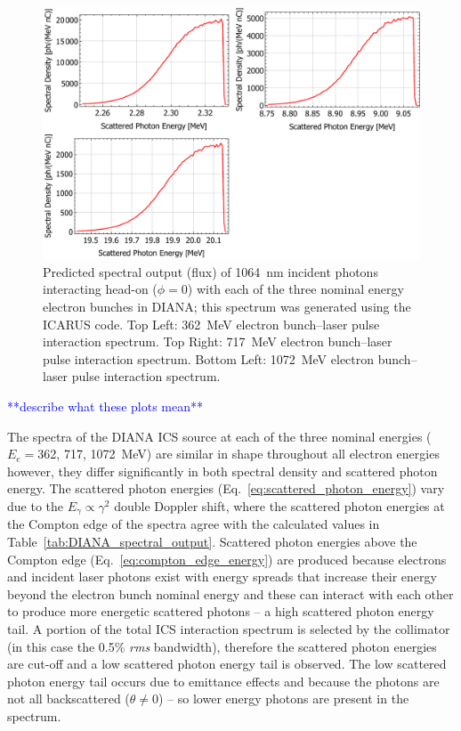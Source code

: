 \documentclass[../main.tex]{subfiles}
\begin{document}
\begin{figure}[!h]
\centering
\includegraphics[width=\textwidth]{Figures/DIANA_Inverse_Compton_Source_Design/DIANA_spectra.pdf}
\caption{Predicted spectral output (flux) of 1064~\si{\nano\meter} incident photons interacting head-on ($\phi=0$) with each of the three nominal energy electron bunches in DIANA; this spectrum was generated using the \textsc{ICARUS} code. Top Left: 362~\si{\mega\electronvolt}  electron bunch--laser pulse interaction spectrum. %
Top Right: 717~\si{\mega\electronvolt}  electron bunch--laser pulse interaction spectrum. Bottom Left: 1072~\si{\mega\electronvolt}  electron bunch--laser pulse interaction spectrum.}
\label{fig:DIANA_spectra}
\end{figure}

\textcolor{blue}{**describe what these plots mean**}

The spectra of the DIANA ICS source at each of the three nominal energies ($E_{e} = $362, 717, 1072~\si{\mega\electronvolt}) are similar in shape throughout all electron energies however, they differ significantly in both spectral density and scattered photon energy. The scattered photon energies (Eq.~\ref{eq:scattered_photon_energy}) vary due to the $E_{\gamma}\propto\gamma^{2}$ double Doppler shift, where the scattered photon energies at the Compton edge of the spectra agree with the calculated values in Table~\ref{tab:DIANA_spectral_output}. Scattered photon energies above the Compton edge (Eq.~\ref{eq:compton_edge_energy}) are produced because electrons and incident laser photons exist with energy spreads that increase their energy beyond the electron bunch nominal energy and these can interact with each other to produce more energetic scattered photons -- a high scattered photon energy tail. A portion of the total ICS interaction spectrum is selected by the collimator (in this case the 0.5\% \textit{rms} bandwidth), therefore the scattered photon energies are cut-off and a low scattered photon energy tail is observed. The low scattered photon energy tail occurs due to emittance effects and because the photons are not all backscattered ($\theta\neq 0$) -- so lower energy photons are present in the spectrum.   
\end{document}
